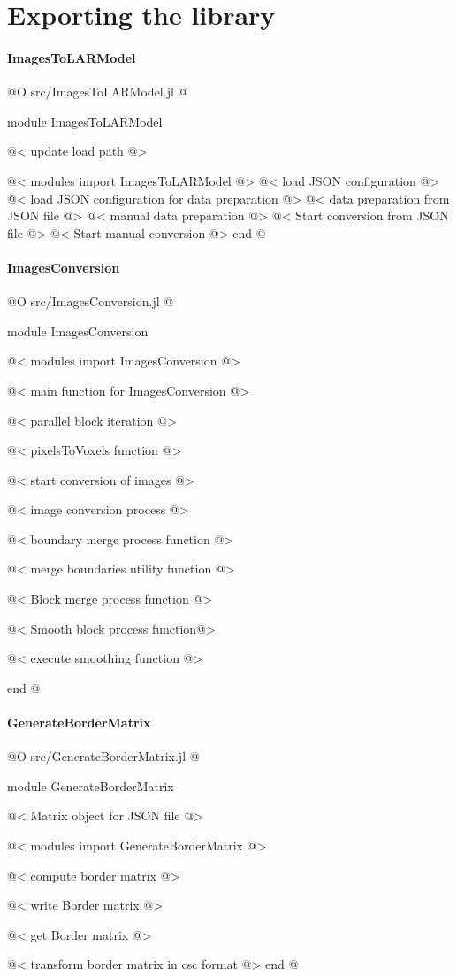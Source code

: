 \documentclass[11pt,oneside]{article}	%
\begin{document}
\section{Exporting the library}

\paragraph{ImagesToLARModel}
@O src/ImagesToLARModel.jl
@{module ImagesToLARModel

@< update load path @>

@< modules import ImagesToLARModel @>
@< load JSON configuration @>
@< load JSON configuration for data preparation @>
@< data preparation from JSON file @>
@< manual data preparation @>
@< Start conversion from JSON file @>
@< Start manual conversion @>
end
@}

\paragraph{ImagesConversion}
@O src/ImagesConversion.jl
@{module ImagesConversion

@< modules import ImagesConversion @>

@< main function for ImagesConversion @>

@< parallel block iteration @>

@< pixelsToVoxels function @>

@< start conversion of images @>

@< image conversion process @>

@< boundary merge process function @>

@< merge boundaries utility function @>

@< Block merge process function @>

@< Smooth block process function@>

@< execute smoothing function @>

end
@}

\paragraph{GenerateBorderMatrix}

@O src/GenerateBorderMatrix.jl
@{module GenerateBorderMatrix

@< Matrix object for JSON file @>

@< modules import GenerateBorderMatrix @>

@< compute border matrix @>

@< write Border matrix  @>

@< get Border matrix @>

@< transform border matrix in csc format @>
end
@}
\end{document}
